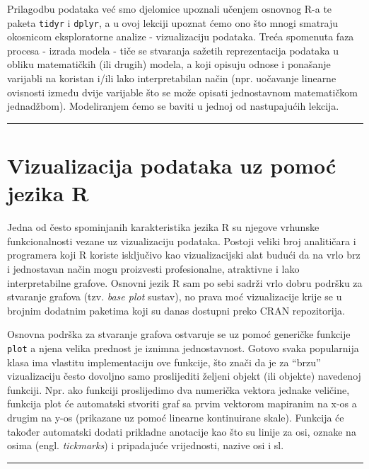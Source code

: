 \documentclass[]{book}
\theoremstyle{definition}
\theoremstyle{definition}
\theoremstyle{definition}
\theoremstyle{remark}
\begin{document}
Prilagodbu podataka već smo djelomice upoznali učenjem osnovnog R-a te
paketa \texttt{tidyr} i \texttt{dplyr}, a u ovoj lekciji upoznat ćemo
ono što mnogi smatraju okosnicom eksploratorne analize - vizualizaciju
podataka. Treća spomenuta faza procesa - izrada modela - tiče se
stvaranja sažetih reprezentacija podataka u obliku matematičkih (ili
drugih) modela, a koji opisuju odnose i ponašanje varijabli na koristan
i/ili lako interpretabilan način (npr. uočavanje linearne ovisnosti
između dvije varijable što se može opisati jednostavnom matematičkom
jednadžbom). Modeliranjem ćemo se baviti u jednoj od nastupajućih
lekcija.

\begin{center}\rule{0.5\linewidth}{\linethickness}\end{center}

\section{Vizualizacija podataka uz pomoć jezika
R}\label{vizualizacija-podataka-uz-pomoc-jezika-r}

Jedna od često spominjanih karakteristika jezika R su njegove vrhunske
funkcionalnosti vezane uz vizualizaciju podataka. Postoji veliki broj
analitičara i programera koji R koriste isključivo kao vizualizacijski
alat budući da na vrlo brz i jednostavan način mogu proizvesti
profesionalne, atraktivne i lako interpretabilne grafove. Osnovni jezik
R sam po sebi sadrži vrlo dobru podršku za stvaranje grafova (tzv.
\emph{base plot} sustav), no prava moć vizualizacije krije se u brojnim
dodatnim paketima koji su danas dostupni preko CRAN repozitorija.

Osnovna podrška za stvaranje grafova ostvaruje se uz pomoć generičke
funkcije \texttt{plot} a njena velika prednost je iznimna jednostavnost.
Gotovo svaka popularnija klasa ima vlastitu implementaciju ove funkcije,
što znači da je za ``brzu'' vizualizaciju često dovoljno samo
proslijediti željeni objekt (ili objekte) navedenoj funkciji. Npr. ako
funkciji proslijedimo dva numerička vektora jednake veličine, funkcija
plot će automatski stvoriti graf sa prvim vektorom mapiranim na x-os a
drugim na y-os (prikazane uz pomoć linearne kontinuirane skale).
Funkcija će također automatski dodati prikladne anotacije kao što su
linije za osi, oznake na osima (engl. \emph{tickmarks}) i pripadajuće
vrijednosti, nazive osi i sl.

\begin{center}\rule{0.5\linewidth}{\linethickness}\end{center}
\end{document}
